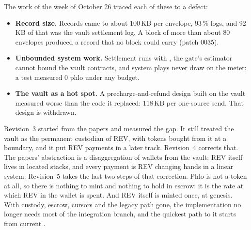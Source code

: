 \documentclass[11pt]{article}
\newcommand{\code}{\path}
\begin{document}
The work of the week of October 26 traced each of these to a defect:
\begin{itemize}
\item \textbf{Record size.} Records came to about 100\,KB per envelope, 93\,\% logs, and 92\,KB of that was the vault settlement log. A block of more than about 80 envelopes produced a record that no block could carry (patch 0035).
\item \textbf{Unbounded system work.} Settlement runs with \code{Cost::unsafe_max()}, the gate's estimator cannot bound the vault contracts, and system plays never draw on the meter: a test measured 0 phlo under any budget.
\item \textbf{The vault as a hot spot.} A precharge-and-refund design built on the vault measured worse than the code it replaced: 118\,KB per one-source send. That design is withdrawn.
\end{itemize}

Revision~3 started from the papers and measured the gap. It still treated the vault as the permanent custodian of REV, with tokens bought from it at a boundary, and it put REV payments in a later track. Revision~4 corrects that. The papers' abstraction is a disaggregation of wallets from the vault: REV itself lives in located stacks, and every payment is REV changing hands in a linear system. Revision~5 takes the last two steps of that correction. Phlo is not a token at all, so there is nothing to mint and nothing to hold in escrow: it is the rate at which REV in the wallet is spent. And REV itself is minted once, at genesis. With custody, escrow, cursors and the legacy path gone, the implementation no longer needs most of the integration branch, and the quickest path to it starts from current \code{dev}.
\end{document}
